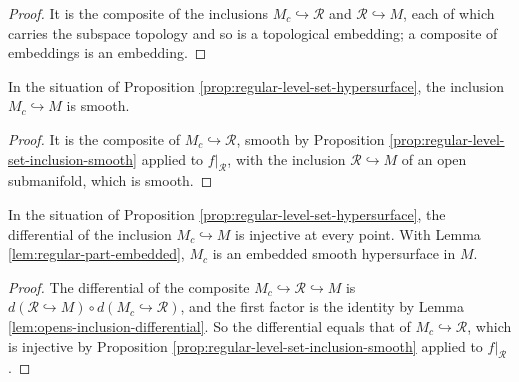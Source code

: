 \begin{proof}
\leanok
It is the composite of the inclusions $M_c \hookrightarrow \mathcal{R}$ and $\mathcal{R} \hookrightarrow M$, each of which carries the subspace topology and so is a topological embedding; a composite of embeddings is an embedding.
\end{proof}

\begin{lemma}
\label{lem:regular-part-inclusion-smooth}
\leanok
{}
In the situation of Proposition \ref{prop:regular-level-set-hypersurface}, the inclusion $M_c \hookrightarrow M$ is smooth.
\end{lemma}

\begin{proof}
\leanok
{}
It is the composite of $M_c \hookrightarrow \mathcal{R}$, smooth by Proposition \ref{prop:regular-level-set-inclusion-smooth} applied to $f|_{\mathcal{R}}$, with the inclusion $\mathcal{R} \hookrightarrow M$ of an open submanifold, which is smooth.
\end{proof}

\begin{lemma}
\label{lem:regular-part-inclusion-immersion}
\leanok
{}
In the situation of Proposition \ref{prop:regular-level-set-hypersurface}, the differential of the inclusion $M_c \hookrightarrow M$ is injective at every point. With Lemma \ref{lem:regular-part-embedded}, $M_c$ is an embedded smooth hypersurface in $M$.
\end{lemma}

\begin{proof}
\leanok
{}
The differential of the composite $M_c \hookrightarrow \mathcal{R} \hookrightarrow M$ is $d(\mathcal{R} \hookrightarrow M) \circ d(M_c \hookrightarrow \mathcal{R})$, and the first factor is the identity by Lemma \ref{lem:opens-inclusion-differential}. So the differential equals that of $M_c \hookrightarrow \mathcal{R}$, which is injective by Proposition \ref{prop:regular-level-set-inclusion-smooth} applied to $f|_{\mathcal{R}}$.
\end{proof}

